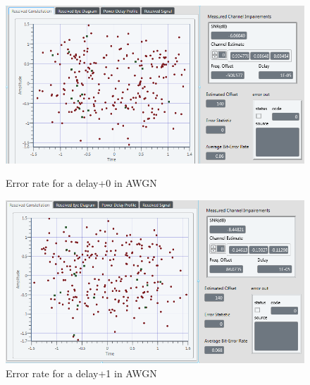 \documentclass[frenchb, oneside, headings=normal]{scrartcl}
\begin{document}
\begin{figure}[!ht]
  \begin{minipage}[b]{0.48\linewidth}
        \centering \includegraphics[scale=0.45]{img/Sliding_correletaion_OFF_AWGN_5dB_shift_bit_0.png}
    \caption{Error rate for a delay+0 in AWGN}
    \label{fig1}
    \end{minipage}\hfill
    \begin{minipage}[b]{0.48\linewidth}
         \centering \includegraphics[scale=0.45]{img/Sliding_correletaion_OFF_AWGN_5dB_shift_bit_1.png}
          \caption{Error rate for a delay+1 in AWGN}
          \label{fig2}
    \end{minipage}
\end{figure}
\end{document}
